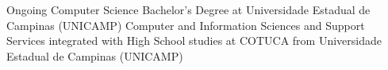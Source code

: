 %
%
%


\begin{scholarship}
					{Ongoing Computer Science Bachelor's Degree at Universidade Estadual de Campinas (UNICAMP)}
	\emptySeparator
					{Computer and Information Sciences and Support Services integrated with High School studies at COTUCA from Universidade Estadual de Campinas (UNICAMP)}

\end{scholarship}